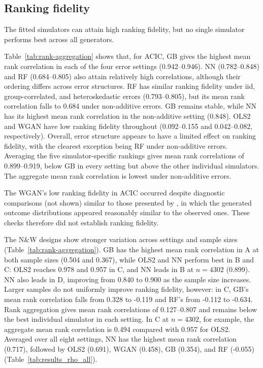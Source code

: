 \subsection{Ranking fidelity}

The fitted simulators can attain high ranking fidelity, but no single simulator performs best across all generators.

Table~\ref{tab:rank-aggregation} shows that, for ACIC, GB gives the highest mean rank correlation in each of the four error settings (0.942--0.946). NN (0.782--0.848) and RF (0.684--0.805) also attain relatively high correlations, although their ordering differs across error structures. RF has similar ranking fidelity under iid, group-correlated, and heteroskedastic errors (0.793--0.805), but its mean rank correlation falls to 0.684 under non-additive errors. GB remains stable, while NN has its highest mean rank correlation in the non-additive setting (0.848). OLS2 and WGAN have low ranking fidelity throughout (0.092--0.155 and 0.042--0.082, respectively). Overall, error structure appears to have a limited effect on ranking fidelity, with the clearest exception being RF under non-additive errors. Averaging the five simulator-specific rankings gives mean rank correlations of 0.899--0.919, below GB in every setting but above the other individual simulators. The aggregate mean rank correlation is lowest under non-additive errors.

The WGAN's low ranking fidelity in ACIC occurred despite diagnostic comparisons (not shown) similar to those presented by , in which the generated outcome distributions appeared reasonably similar to the observed ones. These checks therefore did not establish ranking fidelity.

The N\&W designs show stronger variation across settings and sample sizes (Table~\ref{tab:rank-aggregation}). GB has the highest mean rank correlation in A at both sample sizes (0.504 and 0.367), while OLS2 and NN perform best in B and C: OLS2 reaches 0.978 and 0.957 in C, and NN leads in B at \(n=4302\) (0.899). NN also leads in D, improving from 0.840 to 0.900 as the sample size increases. Larger samples do not uniformly improve ranking fidelity, however: in C, GB's mean rank correlation falls from 0.328 to -0.119 and RF's from -0.112 to -0.634. Rank aggregation gives mean rank correlations of 0.127--0.807 and remains below the best individual simulator in each setting. In C at \(n=4302\), for example, the aggregate mean rank correlation is 0.494 compared with 0.957 for OLS2. Averaged over all eight settings, NN has the highest mean rank correlation (0.717), followed by OLS2 (0.691), WGAN (0.458), GB (0.354), and RF (-0.055) (Table~\ref{tab:results_rho_all}).

